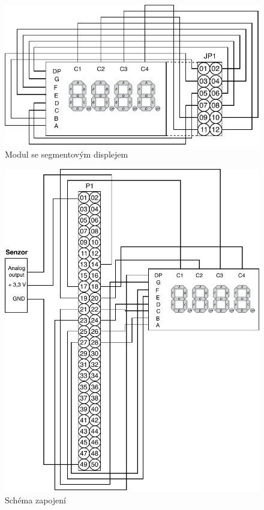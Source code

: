 \documentclass[a4paper, 11pt, twocolumn]{article}
\begin{document}
	\begin{figure}[ht]
		\centering
		\includegraphics[width=1 \linewidth]{inc/display.pdf}

		\caption{Modul se segmentovým displejem}
		\label{fig:display}
	\end{figure}

	\begin{figure}[ht]
		\centering
		\includegraphics[width=1 \linewidth]{inc/hardware_connection.pdf}

		\caption{Schéma zapojení}
		\label{fig:hardware_connection}
	\end{figure}
\end{document}
